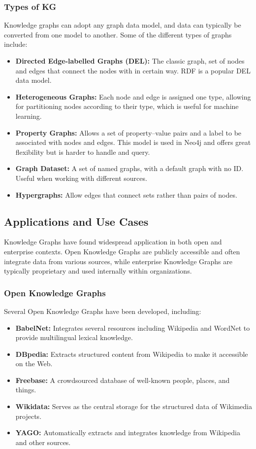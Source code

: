 \documentclass[11pt]{article} %
\begin{document}
\subsubsection*{Types of KG}
Knowledge graphs can adopt any graph data model, and data can typically be converted from one model to another. Some of the different types of graphs include:

\begin{itemize}
    \item \textbf{Directed Edge-labelled Graphs (DEL):} The classic graph, set of nodes and edges that connect the nodes with in certain way. RDF is a popular DEL data model.
    \item \textbf{Heterogeneous Graphs:} Each node and edge is assigned one type, allowing for partitioning nodes according to their type, which is useful for machine learning.
    \item \textbf{Property Graphs:} Allows a set of property–value pairs and a label to be associated with nodes and edges. This model is used in Neo4j and offers great flexibility but is harder to handle and query.
    \item \textbf{Graph Dataset:} A set of named graphs, with a default graph with no ID. Useful when working with different sources.
    \item \textbf{Hypergraphs:} Allow edges that connect sets rather than pairs of nodes.
\end{itemize}


\subsection{Applications and Use Cases}

Knowledge Graphs have found widespread application in both open and enterprise contexts. Open Knowledge Graphs are publicly accessible and often integrate data from various sources, while enterprise Knowledge Graphs are typically proprietary and used internally within organizations.

\subsubsection*{Open Knowledge Graphs}

Several Open Knowledge Graphs have been developed, including:

\begin{itemize}
    \item \textbf{BabelNet:} Integrates several resources including Wikipedia and WordNet to provide multilingual lexical knowledge.
    \item \textbf{DBpedia:} Extracts structured content from Wikipedia to make it accessible on the Web.
    \item \textbf{Freebase:} A crowdsourced database of well-known people, places, and things.
    \item \textbf{Wikidata:} Serves as the central storage for the structured data of Wikimedia projects.
    \item \textbf{YAGO:} Automatically extracts and integrates knowledge from Wikipedia and other sources.
\end{itemize}
\end{document}
